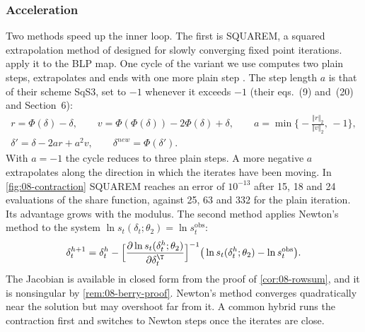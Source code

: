 \subsubsection{Acceleration}
Two methods speed up the inner loop. The first is SQUAREM, a squared extrapolation method of
\citet{VaradhanRoland2008} designed for slowly converging fixed point iterations.
\citet[Section~2.3]{ReynaertsVaradhanNash2012} apply it to the BLP map. One cycle of the variant we use computes
two plain steps, extrapolates and ends with one more plain step \citep[Table~1]{VaradhanRoland2008}. The step
length $a$ is that of their scheme SqS3, set to $-1$ whenever it exceeds $-1$ (their eqs.~(9) and~(20) and
Section~6):
\begin{gather*}
  r = \Phi(\delta) - \delta, \qquad v = \Phi(\Phi(\delta)) - 2\Phi(\delta) + \delta, \qquad
  a = \min\Big\{-\frac{\Vert r\Vert_2}{\Vert v\Vert_2},\, -1\Big\}, \\
  \delta' = \delta - 2ar + a^2 v, \qquad \delta^{new} = \Phi(\delta').
\end{gather*}
With $a = -1$ the cycle reduces to three plain steps. A more negative $a$ extrapolates along the direction in
which the iterates have been moving. In \cref{fig:08-contraction} SQUAREM reaches an error of $10^{-13}$ after
15, 18 and 24 evaluations of the share function, against 25, 63 and 332 for the plain iteration. Its advantage
grows with the modulus. The second method applies Newton's method to the system $\ln s_t(\delta_t;\theta_2)
= \ln s^{\text{obs}}_t$:
\begin{equation*}
  \delta^{h+1}_t = \delta^h_t - \Big[\frac{\partial \ln s_t(\delta^h_t;\theta_2)}{\partial
  \delta_t^\T}\Big]^{-1}\big(\ln s_t(\delta^h_t;\theta_2) - \ln s^{\text{obs}}_t\big).
\end{equation*}
The Jacobian is available in closed form from the proof of \cref{cor:08-rowsum}, and it is nonsingular by
\cref{rem:08-berry-proof}. Newton's method converges quadratically near the solution but may overshoot far
from it. A common hybrid runs the contraction first and switches to Newton steps once the iterates are close.

